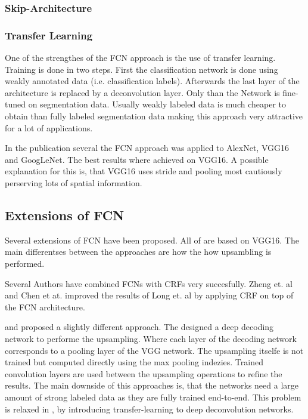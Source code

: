 \subsubsection{Skip-Architecture}



\subsubsection{Transfer Learning} One of the strengthes of the FCN approach is the use of transfer learning. Training is done in two steps. First the classification network is done using weakly annotated data (i.e. classification labels). Afterwards the last layer of the architecture is replaced by a deconvolution layer. Only than the Network is fine-tuned on segmentation data. Usually weakly labeled data is much cheaper to obtain than fully labeled segmentation data making this approach very attractive for a lot of applications.


In the publication several the FCN approach was applied to AlexNet, VGG16 and GoogLeNet. The best results where achieved on VGG16. A possible explanation for this is, that VGG16 uses stride and pooling most cautiously perserving lots of spatial information.




\subsection{Extensions of FCN}

Several extensions of FCN have been proposed. All of are based on VGG16. The main differentses between the approaches are how the how upsambling is performed. 

Several Authors have combined FCNs with CRFs very succesfully. Zheng et. al \cite{CRF1} and Chen et at. \cite{CRF2} improved the results of Long et. al \cite{fcn} by applying \gls{CRF} on top of the FCN architecture. 

\cite{deconv1} and \cite{segnet} proposed a slightly different approach. The designed a deep decoding network to performe the upsampling. Where each layer of the decoding network corresponds to a pooling layer of the VGG network. The upsampling itselfe is not trained but computed directly using the max pooling indezies. Trained convolution layers are used between the upsampling operations to refine the results. The main downside of this approaches is, that the networks need a large amount of strong labeled data as they are fully trained end-to-end. This problem is relaxed in \cite{decoupled}, by introducing transfer-learning to deep deconvolution networks.





